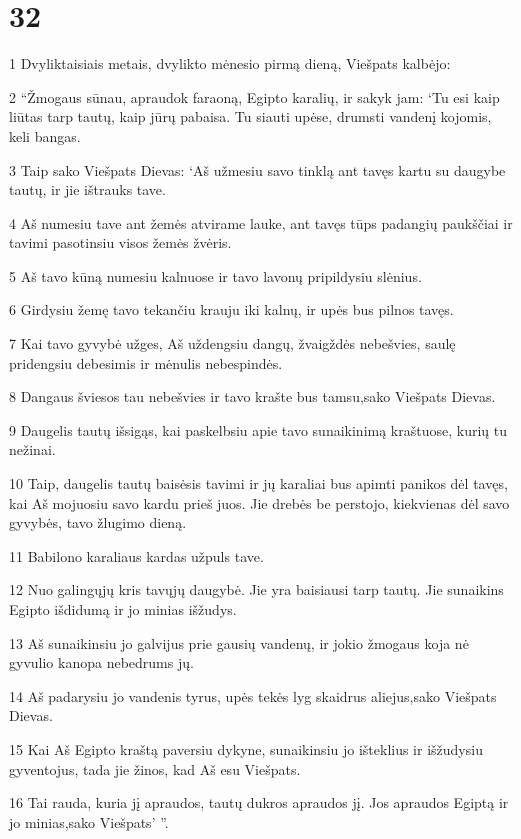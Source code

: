\chapter{32}


\par 1 Dvyliktaisiais metais, dvylikto mėnesio pirmą dieną, Viešpats kalbėjo: 
\par 2 “Žmogaus sūnau, apraudok faraoną, Egipto karalių, ir sakyk jam: ‘Tu esi kaip liūtas tarp tautų, kaip jūrų pabaisa. Tu siauti upėse, drumsti vandenį kojomis, keli bangas. 
\par 3 Taip sako Viešpats Dievas: ‘Aš užmesiu savo tinklą ant tavęs kartu su daugybe tautų, ir jie ištrauks tave. 
\par 4 Aš numesiu tave ant žemės atvirame lauke, ant tavęs tūps padangių paukščiai ir tavimi pasotinsiu visos žemės žvėris. 
\par 5 Aš tavo kūną numesiu kalnuose ir tavo lavonų pripildysiu slėnius. 
\par 6 Girdysiu žemę tavo tekančiu krauju iki kalnų, ir upės bus pilnos tavęs. 
\par 7 Kai tavo gyvybė užges, Aš uždengsiu dangų, žvaigždės nebešvies, saulę pridengsiu debesimis ir mėnulis nebespindės. 
\par 8 Dangaus šviesos tau nebešvies ir tavo krašte bus tamsu,­sako Viešpats Dievas.­ 
\par 9 Daugelis tautų išsigąs, kai paskelbsiu apie tavo sunaikinimą kraštuose, kurių tu nežinai. 
\par 10 Taip, daugelis tautų baisėsis tavimi ir jų karaliai bus apimti panikos dėl tavęs, kai Aš mojuosiu savo kardu prieš juos. Jie drebės be perstojo, kiekvienas dėl savo gyvybės, tavo žlugimo dieną. 
\par 11 Babilono karaliaus kardas užpuls tave. 
\par 12 Nuo galingųjų kris tavųjų daugybė. Jie yra baisiausi tarp tautų. Jie sunaikins Egipto išdidumą ir jo minias išžudys. 
\par 13 Aš sunaikinsiu jo galvijus prie gausių vandenų, ir jokio žmogaus koja nė gyvulio kanopa nebedrums jų. 
\par 14 Aš padarysiu jo vandenis tyrus, upės tekės lyg skaidrus aliejus,­sako Viešpats Dievas.­ 
\par 15 Kai Aš Egipto kraštą paversiu dykyne, sunaikinsiu jo išteklius ir išžudysiu gyventojus, tada jie žinos, kad Aš esu Viešpats. 
\par 16 Tai rauda, kuria jį apraudos, tautų dukros apraudos jį. Jos apraudos Egiptą ir jo minias,­sako Viešpats’ ”. 
